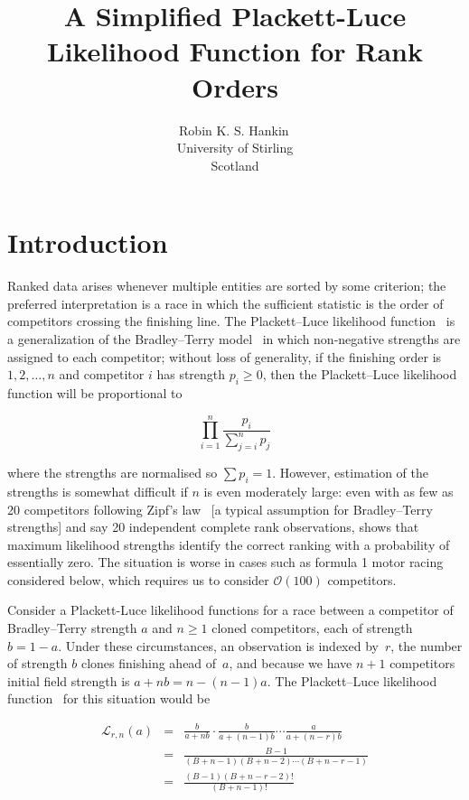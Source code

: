 \documentclass[article]{ajs}
\author{Robin K. S. Hankin\,\orcidlink{0000-0001-5982-0415}\\
  University of Stirling\\ Scotland}
\title{A Simplified Plackett-Luce Likelihood Function for Rank Orders}
\begin{document}

\section{Introduction}

Ranked data arises whenever multiple entities are sorted by some
criterion; the preferred interpretation is a race in which the
sufficient statistic is the order of competitors crossing the
finishing line.  The Plackett--Luce likelihood
function~\citep{luce1959,plackett1975} is a generalization of the
Bradley--Terry model~\citep{bradley1952} in which non-negative
strengths are assigned to each competitor; without loss of generality,
if the finishing order is $1,2,\ldots,n$ and competitor $i$ has
strength $p_i\geqslant 0$, then the Plackett--Luce likelihood function
will be proportional to

\begin{equation}\label{plackettluce}
\prod_{i=1}^n\frac{p_i}{\sum_{j=i}^np_j}
\end{equation}

\noindent where the strengths are normalised so $\sum p_i=1$.
However, estimation of the strengths is somewhat difficult if $n$ is
even moderately large: even with as few as 20 competitors following
Zipf's law~\citep{zipf1949} [a typical assumption for Bradley--Terry
  strengths] and say 20 independent complete rank observations,
\cite{hankin2017_rmd} shows that maximum likelihood strengths
identify the correct ranking with a probability of essentially zero.
The situation is worse in cases such as formula 1 motor racing
considered below, which requires us to consider ${\mathcal O}(100)$
competitors.

Consider a Plackett-Luce likelihood functions for a race between a
competitor of Bradley--Terry strength $a$ and $n\geqslant 1$ cloned
competitors, each of strength $b=1-a$.  Under these circumstances, an
observation is indexed by~$r$, the number of strength $b$ clones
finishing ahead of~$a$, and because we have $n+1$
competitors %
initial field strength is $a+nb=n-(n-1)a$.  The Plackett--Luce
likelihood function~\citep{luce1959,plackett1975} for this situation
would be

\begin{eqnarray}\label{likeforrn1}
  \mathcal{L}_{r,n}(a) &=&
\frac{b}{a+ n   b}\cdot
\frac{b}{a+(n-1)b}\cdots\frac{a}{a+(n-r)b}\nonumber\\
&=& \frac{B-1}{(B+n-1)(B+n-2)\cdots(B+n-r-1)}\nonumber\\ 
&=& \frac{(B-1)(B+n-r-2)!}{(B+n-1)!}\label{likeforrn3}
\end{eqnarray}
\end{document}
